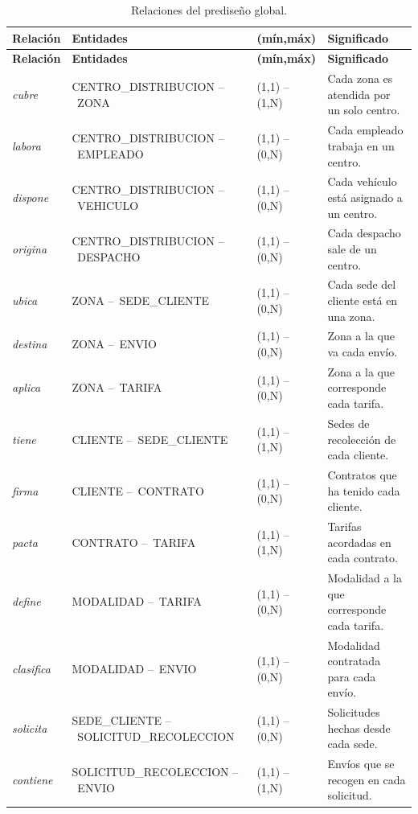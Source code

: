 {\singlespacing\small
\begin{longtable}{L{1.5cm} L{5.0cm} L{2.2cm} L{5.4cm}}
\caption{Relaciones del prediseño global.}
\label{tab:relacionesglobal}\\
\toprule
\textbf{Relación} & \textbf{Entidades} & \textbf{(mín,máx)} & \textbf{Significado} \\
\midrule
\endfirsthead
\toprule
\textbf{Relación} & \textbf{Entidades} & \textbf{(mín,máx)} & \textbf{Significado} \\
\midrule
\endhead
\bottomrule
\endfoot
\textit{cubre} & CENTRO\_DISTRIBUCION --\allowbreak\ ZONA & (1,1) -- (1,N) & Cada zona es atendida por un solo centro. \\
\textit{labora} & CENTRO\_DISTRIBUCION --\allowbreak\ EMPLEADO & (1,1) -- (0,N) & Cada empleado trabaja en un centro. \\
\textit{dispone} & CENTRO\_DISTRIBUCION --\allowbreak\ VEHICULO & (1,1) -- (0,N) & Cada vehículo está asignado a un centro. \\
\textit{origina} & CENTRO\_DISTRIBUCION --\allowbreak\ DESPACHO & (1,1) -- (0,N) & Cada despacho sale de un centro. \\
\textit{ubica} & ZONA --\allowbreak\ SEDE\_CLIENTE & (1,1) -- (0,N) & Cada sede del cliente está en una zona. \\
\textit{destina} & ZONA --\allowbreak\ ENVIO & (1,1) -- (0,N) & Zona a la que va cada envío. \\
\textit{aplica} & ZONA --\allowbreak\ TARIFA & (1,1) -- (0,N) & Zona a la que corresponde cada tarifa. \\
\textit{tiene} & CLIENTE --\allowbreak\ SEDE\_CLIENTE & (1,1) -- (1,N) & Sedes de recolección de cada cliente. \\
\textit{firma} & CLIENTE --\allowbreak\ CONTRATO & (1,1) -- (0,N) & Contratos que ha tenido cada cliente. \\
\textit{pacta} & CONTRATO --\allowbreak\ TARIFA & (1,1) -- (1,N) & Tarifas acordadas en cada contrato. \\
\textit{define} & MODALIDAD --\allowbreak\ TARIFA & (1,1) -- (0,N) & Modalidad a la que corresponde cada tarifa. \\
\textit{clasifica} & MODALIDAD --\allowbreak\ ENVIO & (1,1) -- (0,N) & Modalidad contratada para cada envío. \\
\textit{solicita} & SEDE\_CLIENTE --\allowbreak\ SOLICITUD\_RECOLECCION & (1,1) -- (0,N) & Solicitudes hechas desde cada sede. \\
\textit{contiene} & SOLICITUD\_RECOLECCION --\allowbreak\ ENVIO & (1,1) -- (1,N) & Envíos que se recogen en cada solicitud. \\

\end{longtable}}
